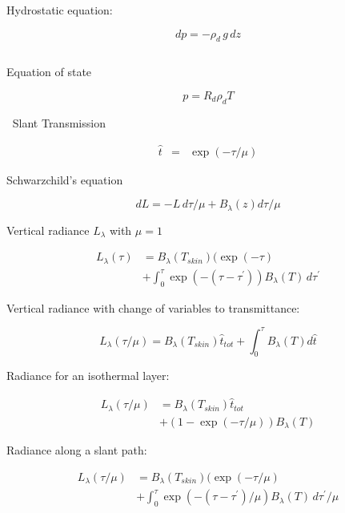 \documentclass[12pt]{article}
\begin{document}
\begin{multicols}{2}
$~$

\noindent
Hydrostatic equation:

\begin{equation}
  \label{eq:hydro}
  dp = -\rho_d\, g\, dz
\end{equation}

$~$

\noindent
Equation of state

\begin{equation}
  \label{eq:state}
  p = R_d \rho_d T
\end{equation}


$~$
\noindent
Slant Transmission 

\begin{eqnarray}
\hat{t}  &=& \exp ( - \tau/\mu ) 
\end{eqnarray}
$~$

\noindent
Schwarzchild's equation

\begin{equation}
  \label{eq:schwarz}
  dL = -L\, d\tau/\mu  + B_{\lambda}(z) d\tau/\mu
\end{equation}
$~$

\noindent
Vertical radiance $L_\lambda$  with $\mu = 1$

\begin{align}
  L_\lambda(\tau)&= B_\lambda(T_{skin})( \exp(-\tau)  \nonumber \\
  &+    \int_0^{\tau} \exp\left(  - (\tau -\tau^\prime) \right )
     B_\lambda(T)\, d\tau^\prime 
\end{align}

\noindent
Vertical radiance with change of variables to transmittance:   

\begin{equation}
       L_\lambda(\tau/\mu)= B_\lambda(T_{skin}) \hat{t}_{tot} +    \int_0^{\tau} B_\lambda(T) d\hat{t} 
     \end{equation}
\noindent

Radiance for an isothermal layer:

\begin{align}
  L_\lambda(\tau/\mu)&= B_\lambda(T_{skin}) \hat{t}_{tot} \nonumber\\
             &+  (1 - \exp(-\tau/\mu) )B_\lambda(T)
\end{align}





\noindent
Radiance along a slant path:

\begin{align}
  L_\lambda(\tau/\mu) &= B_\lambda(T_{skin})( \exp(-\tau/\mu) \nonumber \\
  &+  \int_0^{\tau} \exp\left(  - (\tau -\tau^\prime)/\mu \right )
     B_\lambda(T)\, d\tau^\prime/\mu 
\end{align}


\end{multicols}
\end{document}
